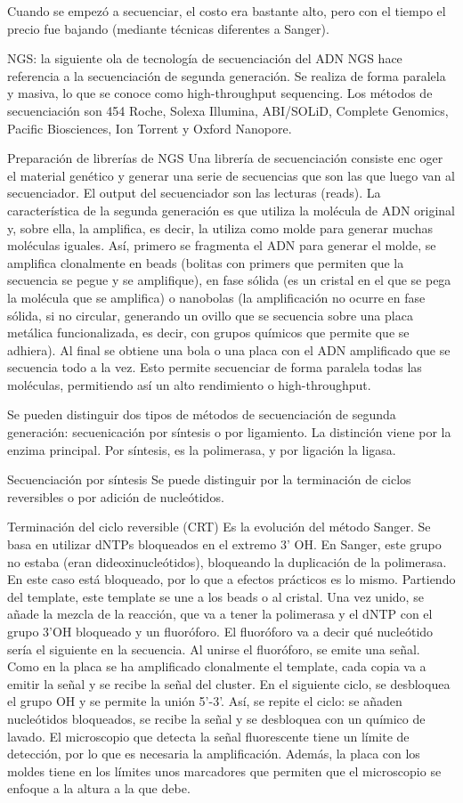 Cuando se empezó a secuenciar, el costo era bastante alto, pero con el tiempo el precio fue bajando (mediante técnicas diferentes a Sanger).

NGS: la siguiente ola de tecnología de secuenciación del ADN
NGS hace referencia a la secuenciación de segunda generación. Se realiza de forma paralela y masiva, lo que se conoce como high-throughput sequencing. Los métodos de secuenciación son 454 Roche, Solexa Illumina, ABI/SOLiD, Complete Genomics, Pacific Biosciences, Ion Torrent y Oxford Nanopore. 

Preparación de librerías de NGS
Una librería de secuenciación consiste enc oger el material genético y generar una serie de secuencias que son las que luego van al secuenciador. El output del secuenciador son las lecturas (reads). La característica de la segunda generación es que utiliza la molécula de ADN original y, sobre ella, la amplifica, es decir, la utiliza como molde para generar muchas moléculas iguales. Así, primero se fragmenta el ADN para generar el molde, se amplifica clonalmente en beads (bolitas con primers que permiten que la secuencia se pegue y se amplifique), en fase sólida (es un cristal en el que se pega la molécula que se amplifica) o nanobolas (la amplificación no ocurre en fase sólida, si no circular, generando un ovillo que se secuencia sobre una placa metálica funcionalizada, es decir, con grupos químicos que permite que se adhiera). Al final se obtiene una bola o una placa con el ADN amplificado que se secuencia todo a la vez. Esto permite secuenciar de forma paralela todas las moléculas, permitiendo así un alto rendimiento o high-throughput. 

Se pueden distinguir dos tipos de métodos de secuenciación de segunda generación: secuenicación por síntesis o por ligamiento.  La distinción viene por la enzima principal. Por síntesis, es la polimerasa, y por ligación la ligasa. 

Secuenciación por síntesis
Se puede distinguir por la terminación de ciclos reversibles o por adición de nucleótidos.

Terminación del ciclo reversible (CRT)
Es la evolución del método Sanger. Se basa en utilizar dNTPs bloqueados en el extremo 3' OH. En Sanger, este grupo no estaba (eran dideoxinucleótidos), bloqueando la duplicación de la polimerasa. En este caso está bloqueado, por lo que a efectos prácticos es lo mismo. Partiendo del template, este template se une a los beads o al cristal. Una vez unido, se añade la mezcla de la reacción, que va a tener la polimerasa y el dNTP con el grupo 3'OH bloqueado y un fluoróforo. El fluoróforo va a decir qué nucleótido sería el siguiente en la secuencia. Al unirse el fluoróforo, se emite una señal. Como en la placa se ha amplificado clonalmente el template, cada copia va a emitir la señal y se recibe la señal del cluster. En el siguiente ciclo, se desbloquea el grupo OH y se permite la unión 5'-3'. Así, se repite el ciclo: se añaden nucleótidos bloqueados, se recibe la señal y se desbloquea con un químico de lavado. El microscopio que detecta la señal fluorescente tiene un límite de detección, por lo que es necesaria la amplificación. Además, la placa con los moldes tiene en los límites unos marcadores que permiten que el microscopio se enfoque a la altura a la que debe. 

